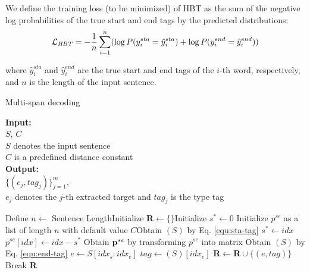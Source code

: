 \documentclass{ecai}
\begin{document}
We define the training loss (to be minimized) of HBT as the sum of the negative log probabilities of the true start and end tags by the predicted distributions:
\begin{equation}
\label{equ:hbm}
\small
   \mathcal{L}_{\text{\emph{HBT}}} = -\frac{1}{n} \sum_{i=1}^n (\log P(y^{sta}_i=\hat{y}^{sta}_i)+\log P(y^{end}_i=\hat{y}^{end}_i))
\end{equation}

\noindent where $\hat{y}^{sta}_i$ and $\hat{y}^{end}_i$ are the true start and end tags of the $i$-th word, respectively, and $n$ is the length of the input sentence.

\begin{algorithm}[t]
\label{algo:hbm}
\small
\caption{Multi-span decoding} 
\label{algo:hmsd}
{\bf Input:} \hspace*{0.02in} \\ 
$S$, $C$ \\
\hspace*{0.15in} $S$ denotes the input sentence\\
\hspace*{0.15in} $C$ is a predefined distance constant\\
{\bf Output:} \hspace*{0.02in}\\ 
$\{(e_j,tag_j)\}_{j=1}^m$, \\
\hspace*{0.15in} $e_j$ denotes the $j$-th extracted target and $tag_j$ is the type tag
\begin{algorithmic}[1]
\State Define $n \leftarrow$ Sentence Length\State Initialize $\mathbf{R} \leftarrow \{\}$\State Initialize $s^{*} \leftarrow 0$ \State Initialize $p^{se}$ as a  list of length $n$ with default value $C$\State Obtain $(S)$ by Eq. \ref{equ:sta-tag}  
      \State $s^{*} \leftarrow idx$ 
  \EndIf
    \State $p^{se}[idx] \leftarrow idx-s^{*}$ 
  \EndIf
\EndFor 
\State Obtain $\boldsymbol{\rm{p}}^{se}$ by transforming $p^{se}$ into matrix \State Obtain $(S)$ by Eq. \ref{equ:end-tag} 
     
      \State $e \leftarrow S[idx_{s}:idx_{e}]$
      \State $tag \leftarrow $$(S)[idx_{e}]$
      \State $\mathbf{R} \leftarrow \mathbf{R} \cup \{(e,tag)\}$
      \State Break
      \EndIf
    \EndFor 
  \EndIf
\EndFor 
\State \Return $\mathbf{R}$
\end{algorithmic}
\end{algorithm}
\end{document}
